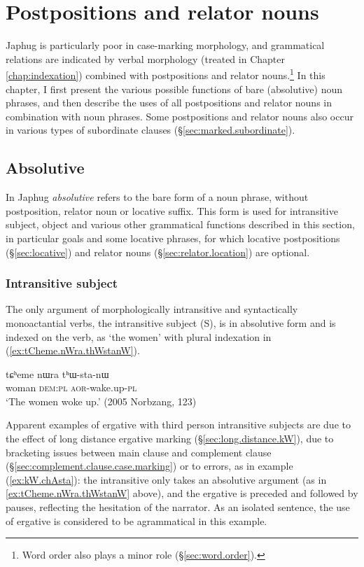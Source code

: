 \chapter{Postpositions and relator nouns} \label{chap:postpositions.relators}
Japhug is particularly poor in case-marking morphology, and grammatical relations are indicated by verbal morphology (treated in Chapter \ref{chap:indexation}) combined with postpositions and relator nouns.\footnote{Word order also plays a minor role (§\ref{sec:word.order}). } In this chapter, I first present the various possible functions of bare (absolutive) noun phrases, and then describe the uses of all postpositions and relator nouns in combination with noun phrases. Some postpositions and relator nouns also occur in various types of subordinate clauses (§\ref{sec:marked.subordinate}).
 

\section{Absolutive} \label{sec:absolutive}
In Japhug \textit{absolutive} refers to the bare form of a noun phrase, without postposition, relator noun or locative suffix. This form is used for intransitive subject, object and various other grammatical functions described in this section, in particular goals and some locative phrases, for which locative postpositions (§\ref{sec:locative}) and relator nouns (§\ref{sec:relator.location}) are optional.

\subsection{Intransitive subject} \label{sec:absolutive.S}
The only argument of morphologically intransitive and syntactically monoactantial verbs, the intransitive subject (S), is in absolutive form and is indexed on the verb, as  `the women' with plural indexation in (\ref{ex:tCheme.nWra.thWstanW}). 

\begin{exe}
\ex \label{ex:tCheme.nWra.thWstanW}
\gll tɕʰeme nɯra tʰɯ-sta-nɯ  \\
woman \textsc{dem}:\textsc{pl} \textsc{aor}-wake.up-\textsc{pl} \\
\glt  `The women woke up.'  (2005 Norbzang, 123)
\end{exe}


Apparent examples of ergative  with third person intransitive subjects are due to the effect of long distance ergative marking (§\ref{sec:long.distance.kW}), due to bracketing issues between main clause and complement clause (§\ref{sec:complement.clause.case.marking}) or to errors, as in example (\ref{ex:kW.chAsta}): the intransitive  only takes an absolutive argument (as in \ref{ex:tCheme.nWra.thWstanW} above), and the ergative  is preceded and followed by pauses, reflecting the hesitation of the narrator. As an isolated sentence, the use of ergative is considered to be agrammatical in this example.

